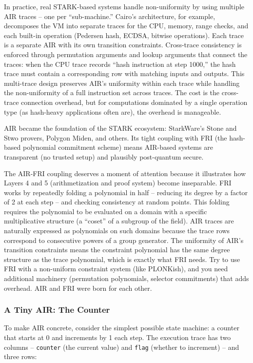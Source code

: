 \documentclass[
  11pt,
  openany]{report}
\begin{document}
In practice, real STARK-based systems handle non-uniformity by using multiple
AIR traces -- one per ``sub-machine.'' Cairo's architecture, for example,
decomposes the VM into separate traces for the CPU, memory, range checks, and
each built-in operation (Pedersen hash, ECDSA, bitwise operations). Each trace
is a separate AIR with its own transition constraints. Cross-trace consistency
is enforced through permutation arguments and lookup arguments that connect the
traces: when the CPU trace records ``hash instruction at step 1000,'' the hash
trace must contain a corresponding row with matching inputs and outputs. This
multi-trace design preserves AIR's uniformity within each trace while handling
the non-uniformity of a full instruction set across traces. The cost is the
cross-trace connection overhead, but for computations dominated by a single
operation type (as hash-heavy applications often are), the overhead is
manageable.

AIR became the foundation of the STARK ecosystem: StarkWare's Stone and Stwo
provers, Polygon Miden, and others. Its tight coupling with FRI (the hash-based
polynomial commitment scheme) means AIR-based systems are transparent (no
trusted setup) and plausibly post-quantum secure.

The AIR-FRI coupling deserves a moment of attention because it illustrates how
Layers 4 and 5 (arithmetization and proof system) become inseparable. FRI works
by repeatedly folding a polynomial in half -- reducing its degree by a factor of
2 at each step -- and checking consistency at random points. This folding
requires the polynomial to be evaluated on a domain with a specific
multiplicative structure (a ``coset'' of a subgroup of the field). AIR traces
are naturally expressed as polynomials on such domains because the trace rows
correspond to consecutive powers of a group generator. The uniformity of AIR's
transition constraints means the constraint polynomial has the same degree
structure as the trace polynomial, which is exactly what FRI needs. Try to use
FRI with a non-uniform constraint system (like PLONKish), and you need
additional machinery (permutation polynomials, selector commitments) that adds
overhead. AIR and FRI were born for each other.

\subsubsection{A Tiny AIR: The Counter}\label{a-tiny-air-the-counter}

To make AIR concrete, consider the simplest possible state machine: a counter
that starts at 0 and increments by 1 each step. The execution trace has two
columns -- \texttt{counter} (the current value) and \texttt{flag} (whether to
increment) -- and three rows:
\end{document}
